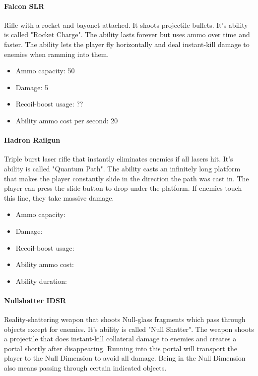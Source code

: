 \documentclass[12pt]{article}
\begin{document}
\paragraph{Falcon SLR}

Rifle with a rocket and bayonet attached. It shoots projectile bullets. It's ability is called "Rocket Charge". The ability lasts forever but uses ammo over time and faster. The ability lets the player fly horizontally and deal instant-kill damage to enemies when ramming into them.

\begin{itemize}
	\item Ammo capacity: 50
	\item Damage: 5
	\item Recoil-boost usage: ??
	\item Ability ammo cost per second: 20
\end{itemize} 


\paragraph{Hadron Railgun}

Triple burst laser rifle that instantly eliminates enemies if all lasers hit. It's ability is called "Quantum Path". The ability casts an infinitely long platform that makes the player constantly slide in the direction the path was cast in. The player can press the slide button to drop under the platform. If enemies touch this line, they take massive damage. 


\begin{itemize}
	\item Ammo capacity: 
	\item Damage: 
	\item Recoil-boost usage: 
	\item Ability ammo cost: 
	\item Ability duration: 
\end{itemize}


\paragraph{Nullshatter IDSR}

Reality-shattering weapon that shoots Null-glass fragments which pass through objects except for enemies. It's ability is called "Null Shatter". The weapon shoots a projectile that does instant-kill collateral damage to enemies and creates a portal shortly after disappearing. Running into this portal will transport the player to the Null Dimension to avoid all damage. Being in the Null Dimension also means passing through certain indicated objects. 
\end{document}
